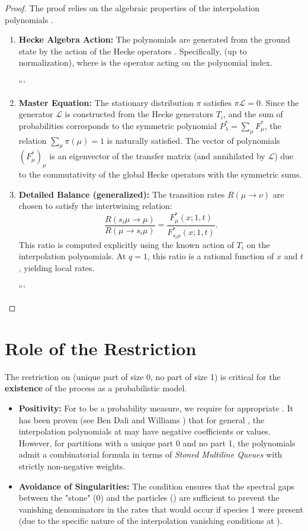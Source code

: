 \documentclass[11pt]{article}
\begin{document}
\begin{proof}
The proof relies on the algebraic properties of the interpolation polynomials .
\begin{enumerate}
\item \textbf{Hecke Algebra Action:} The polynomials  are generated from the ground state  by the action of the Hecke operators . Specifically,  (up to normalization), where  is the operator acting on the polynomial index.

```
\item \textbf{Master Equation:} The stationary distribution $\pi$ satisfies $\pi \mathcal{L} = 0$. Since the generator $\mathcal{L}$ is constructed from the Hecke generators $T_i$, and the sum of probabilities corresponds to the symmetric polynomial $P^*_\lambda = \sum_\mu F^*_\mu$, the relation $\sum_\mu \pi(\mu) = 1$ is naturally satisfied. The vector of polynomials $(F^*_\mu)_\mu$ is an eigenvector of the transfer matrix (and annihilated by $\mathcal{L}$) due to the commutativity of the global Hecke operators with the symmetric sums.

\item \textbf{Detailed Balance (generalized):} The transition rates $R(\mu \to \nu)$ are chosen to satisfy the intertwining relation:
\[
\frac{R(s_i \mu \to \mu)}{R(\mu \to s_i \mu)} = \frac{F^*_\mu(x; 1, t)}{F^*_{s_i \mu}(x; 1, t)}.
\]
This ratio is computed explicitly using the known action of $T_i$ on the interpolation polynomials. At $q=1$, this ratio is a rational function of $x$ and $t$, yielding local rates.

```

\end{enumerate}
\end{proof}

\section{Role of the Restriction}

The restriction on  (unique part of size 0, no part of size 1) is critical for the \textbf{existence} of the process as a probabilistic model.
\begin{itemize}
\item \textbf{Positivity:} For  to be a probability measure, we require  for appropriate . It has been proven (see Ben Dali and Williams \cite{BDW25}) that for general , the interpolation polynomials at  may have negative coefficients or values. However, for partitions with a unique part 0 and no part 1, the polynomials admit a combinatorial formula in terms of \textit{Stoned Multiline Queues} with strictly non-negative weights.
\item \textbf{Avoidance of Singularities:} The condition  ensures that the spectral gaps between the "stone" (0) and the particles () are sufficient to prevent the vanishing denominators in the rates that would occur if species 1 were present (due to the specific nature of the interpolation vanishing conditions at ).
\end{itemize}
\end{document}
